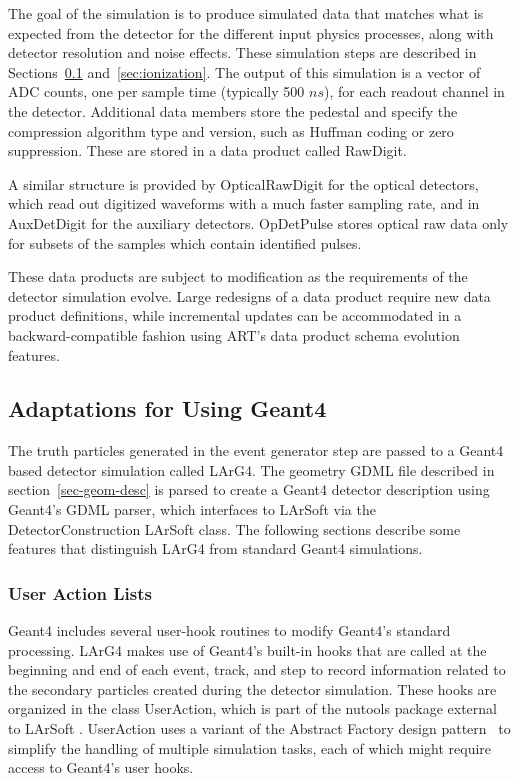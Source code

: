 \documentclass[12pt]{elsarticle}
\newcommand{\larsoft}{LArSoft }
\begin{document}
The goal of the simulation is to produce simulated data that matches what is expected from the detector for
the different input physics processes, along with detector resolution and noise effects.  These simulation
steps are described in Sections~\ref{sec:adapt} and~\ref{sec:ionization}. The output of this simulation is a vector of ADC counts,
one per sample time (typically 500 $ns$), for each readout channel in the detector.  Additional data members
store the pedestal and specify the compression algorithm type and version, such as Huffman coding or zero 
suppression. These are stored in a data product called RawDigit.

A similar structure is provided by OpticalRawDigit for the optical detectors, which read out
digitized waveforms with a much faster sampling rate, and in
AuxDetDigit for the auxiliary detectors.  OpDetPulse stores optical raw data only for 
subsets of the samples which contain identified pulses.

These data products are subject to modification as the requirements of the detector simulation evolve.
Large redesigns of a data product require new data product definitions, while
incremental updates can be accommodated in a backward-compatible fashion using ART's
data product schema evolution features.

\subsection{Adaptations for Using Geant4}
\label{sec:adapt}

The truth particles generated in the event generator step are passed to a Geant4 
based detector simulation called LArG4.  The geometry GDML file 
described in section~\ref{sec-geom-desc} is parsed to create a Geant4 detector description using
Geant4's GDML parser, which interfaces to \larsoft via the DetectorConstruction \larsoft class.
The following sections describe some features that distinguish
LArG4 from standard Geant4 simulations.

\subsubsection{User Action Lists}
\label{sec:useractions}
Geant4 includes several user-hook routines to modify Geant4's
standard processing. LArG4 makes use of Geant4's built-in hooks that
are called at the beginning and end of each event, track, and step to
record information related to the secondary particles created during
the detector simulation. These hooks are organized in the class
UserAction, which is part of the nutools package external to
\larsoft. UserAction uses a variant of the Abstract Factory design
pattern~\cite{designpatterns} to simplify the handling of multiple
simulation tasks, each of which might require access to Geant4's user
hooks.
\end{document}
